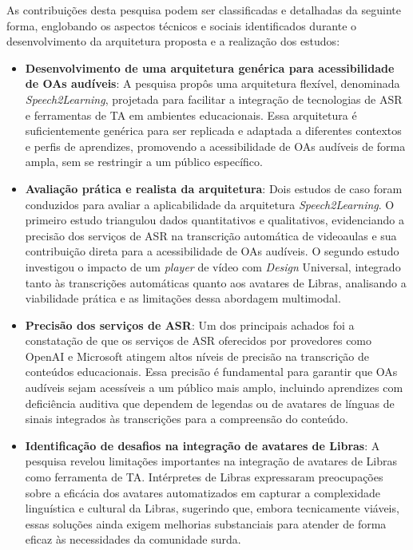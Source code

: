 As contribuições desta pesquisa podem ser classificadas e detalhadas da seguinte forma, englobando os aspectos técnicos e sociais identificados durante o desenvolvimento da arquitetura proposta e a realização dos estudos:

\begin{itemize}
    \item \textbf{Desenvolvimento de uma arquitetura genérica para acessibilidade de OAs audíveis}: A pesquisa propôs uma arquitetura flexível, denominada \textit{Speech2Learning}, projetada para facilitar a integração de tecnologias de ASR e ferramentas de TA em ambientes educacionais. Essa arquitetura é suficientemente genérica para ser replicada e adaptada a diferentes contextos e perfis de aprendizes, promovendo a acessibilidade de OAs audíveis de forma ampla, sem se restringir a um público específico.

    \item \textbf{Avaliação prática e realista da arquitetura}: Dois estudos de caso foram conduzidos para avaliar a aplicabilidade da arquitetura \textit{Speech2Learning}. O primeiro estudo triangulou dados quantitativos e qualitativos, evidenciando a precisão dos serviços de ASR na transcrição automática de videoaulas e sua contribuição direta para a acessibilidade de OAs audíveis. O segundo estudo investigou o impacto de um \textit{player} de vídeo com \textit{Design} Universal, integrado tanto às transcrições automáticas quanto aos avatares de Libras, analisando a viabilidade prática e as limitações dessa abordagem multimodal.

    \item \textbf{Precisão dos serviços de ASR}: Um dos principais achados foi a constatação de que os serviços de ASR oferecidos por provedores como OpenAI e Microsoft atingem altos níveis de precisão na transcrição de conteúdos educacionais. Essa precisão é fundamental para garantir que OAs audíveis sejam acessíveis a um público mais amplo, incluindo aprendizes com deficiência auditiva que dependem de legendas ou de avatares de línguas de sinais integrados às transcrições para a compreensão do conteúdo.

    \item \textbf{Identificação de desafios na integração de avatares de Libras}: A pesquisa revelou limitações importantes na integração de avatares de Libras como ferramenta de TA. Intérpretes de Libras expressaram preocupações sobre a eficácia dos avatares automatizados em capturar a complexidade linguística e cultural da Libras, sugerindo que, embora tecnicamente viáveis, essas soluções ainda exigem melhorias substanciais para atender de forma eficaz às necessidades da comunidade surda.


\end{itemize}
